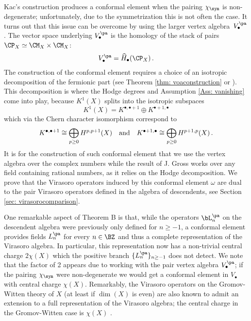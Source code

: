 Kac's construction produces a conformal element when the pairing $\chi_\sym$ is non-degenerate; unfortunately, due to the symmetrization this is not often the case. It turns out that this issue can be overcome by using the larger vertex algebra~$V_\bullet^{\pa}$. The vector space underlying $V_\bullet^{\pa}$ is the homology of the stack of pairs $\CP_X\simeq \CM_X\times \CM_X$:
\[V_\bullet^{\pa}=\widehat{H}_\bullet(\CP_X)\,.\]
The construction of the conformal element requires a choice of an isotropic decomposition of the fermionic part (see Theorem \ref{thm: voaconstruction} or \cite[Section 3.6]{Ka98}). This decomposition is where the Hodge degrees and Assumption \ref{Ass: vanishing} come into play, because $K^1(X)$ splits into the isotropic subspaces
$$K^1(X)=K^{\bullet,\bullet+1}\oplus K^{\bullet+1,\bullet}
$$
which via the Chern character isomorphism correspond to
$$K^{\bullet,\bullet+1}\cong \bigoplus_{p\geq 0}H^{p, p+1}(X)\quad \textup{and}\quad K^{\bullet+1,\bullet}\cong \bigoplus_{p\geq 0}H^{p+1, p}(X)\,.
$$
It is for the construction of such conformal element that we use the vertex algebra over the complex numbers while the result of J. Gross \cite{Gr19} works over any field containing rational numbers, as it relies on the Hodge decomposition. We prove that the Virasoro operators induced by this conformal element $\omega$ are dual to the pair Virasoro operators defined in the algebra of descendents, see Section \ref{sec: virasorocomparison}.


One remarkable aspect of Theorem B is that, while the operators $\bL_n^{\pa}$ on the descendent algebra were previously only defined for $n\geq -1$, a conformal element provides fields $L_n^{\pa}$ for every $n\in \BZ$ and thus a complete representation of the Virasoro algebra. In particular, this representation now has a non-trivial central charge $2\chi(X)$ which the positive branch $\{L_n^{\pa}\}_{n\geq -1}$ does not detect. We note that the factor of 2 appears due to working with the pair vertex algebra $V_\bullet^{\pa}$; if the pairing $\chi_\sym$ were non-degenerate we would get a conformal element in $V_\bullet$ with central charge $\chi(X)$. Remarkably, the Virasoro operators on the Gromov-Witten theory of $X$ (at least if $\dim(X)$ is even) are also known to admit an extension to a full representation of the Virasoro algebra; the central charge in the Gromov-Witten case is $\chi(X)$ \cite[Section 2.10]{getzler}.

